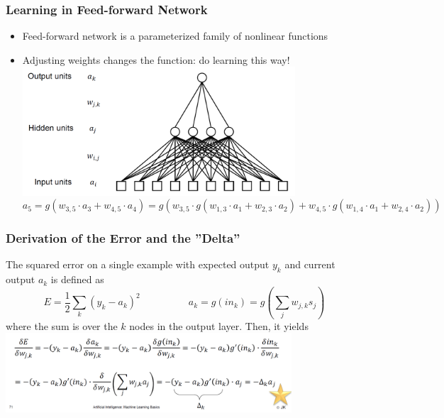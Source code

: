 \documentclass[conference, a4paper]{styles/acmsiggraph}
\begin{document}
\newpage

        \subsubsection{Learning in Feed-forward Network}
            \begin{itemize}
                \item Feed-forward network is a parameterized family of nonlinear functions
                \item Adjusting weights changes the function: do learning this way!\newline
                \includegraphics[width=0.8\textwidth]{imgs/MultiLayerPerceptron.png}
                $$a_5 = g(w_{3,5} \cdot a_3 + w_{4,5} \cdot a_4) = g(w_{3,5} \cdot g(w_{1,3} \cdot a_1 + w_{2,3} \cdot a_2) + w_{4,5} \cdot g(w_{1,4} \cdot a_1 + w_{2,4} \cdot a_2))$$
            \end{itemize}
        
        \subsubsection{Derivation of the Error and the ''Delta''}
            The squared error on a single example with expected output $y_k$ and current output $a_k$ is defined as
            $$E = \frac{1}{2} \sum\limits_{k} (y_k -a_k)^2\ \ \ \ \ \ \ \ \ \ \ \ \ \ \ \ \ \ \ \ \ \ a_k = g(in_k) = g \left( \sum\limits_{j} w_{j,k} s_j \right)$$
            where the sum is over the $k$ nodes in the output layer. Then, it yields\newline
            \includegraphics[width=0.8\textwidth]{imgs/DerivationOfTheErrorAndTheDelta.png}
        
\end{document}
